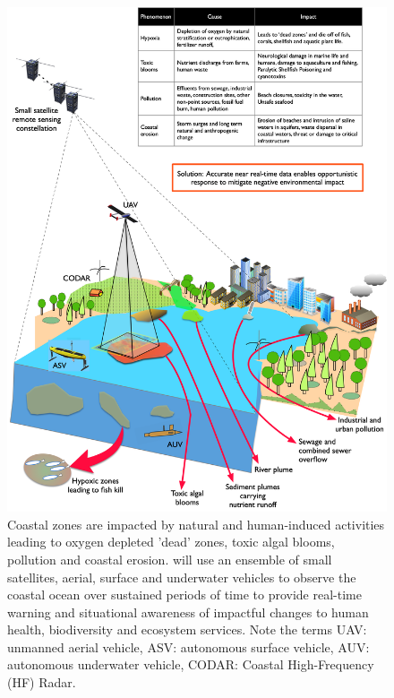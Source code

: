 \documentclass[12pt]{article}
\begin{document}
\begin{figure}[H]
  \centering
  \includegraphics[scale=0.135]{fig/mega-cities-toxic-1.jpg}
  \caption{Coastal zones are impacted by natural and human-induced
    activities leading to oxygen depleted 'dead' zones, toxic algal
    blooms, pollution and coastal erosion. \pro will use an ensemble
    of small satellites, aerial, surface and underwater vehicles to
    observe the coastal ocean over sustained periods of time to
    provide real-time warning and situational awareness of impactful
    changes to human health, biodiversity and ecosystem services. Note
    the terms UAV: unmanned aerial vehicle, ASV: autonomous surface
    vehicle, AUV: autonomous underwater vehicle, CODAR: Coastal
    High-Frequency (HF) Radar.}
    \label{fig:mega-cities}
\end{figure}

\end{document}
